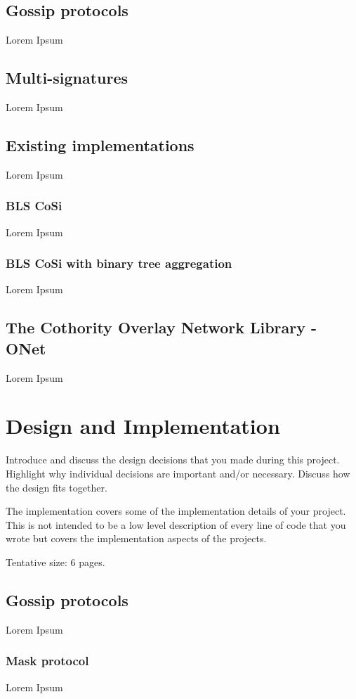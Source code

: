 \documentclass[a4paper,11pt,oneside]{report}
\begin{document}
\section{Gossip protocols}
Lorem Ipsum

\section{Multi-signatures}
Lorem Ipsum

\section{Existing implementations}
Lorem Ipsum

\subsection{BLS CoSi}
Lorem Ipsum

\subsection{BLS CoSi with binary tree aggregation}
Lorem Ipsum

\section{The Cothority Overlay Network Library - ONet}
Lorem Ipsum


\chapter{Design and Implementation}

Introduce and discuss the design decisions that you made during this project.
Highlight why individual decisions are important and/or necessary. Discuss
how the design fits together.

The implementation covers some of the implementation details of your project.
This is not intended to be a low level description of every line of code that
you wrote but covers the implementation aspects of the projects.

Tentative size: 6 pages.

\section{Gossip protocols}
Lorem Ipsum

\subsection{Mask protocol}
Lorem Ipsum
\end{document}
